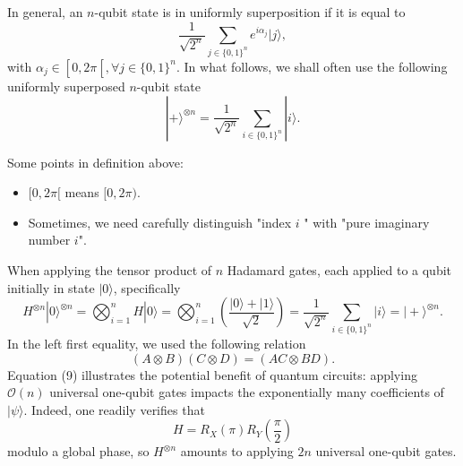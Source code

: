 \begin{definition}
    In general, an $n$-qubit state is in uniformly superposition if it is equal to 
\begin{equation}
    \frac{1}{\sqrt{2^{n}}} \sum_{j \in\{0,1\}^{n}} e^{i \alpha_{j}}|j\rangle,
\end{equation}
with $\alpha_{j} \in\left[0,2 \pi\left[, \forall j \in\{0,1\}^{n}\right.\right.$. %
In what follows, we shall often use the following uniformly superposed $n$-qubit state 
\begin{equation}
    |+\rangle^{\otimes n}=\frac{1}{\sqrt{2^{n}}} \sum_{i \in\{0,1\}^{n}}|i\rangle.
\end{equation}
\end{definition}

\begin{remark} 
Some points in definition above:
    \begin{itemize}
    \item $[0,2 \pi[$ means $[0,2 \pi)$.
    \item Sometimes, we need carefully distinguish "index $i$ " with "pure imaginary number $i$". 
    \end{itemize}
\end{remark}

When applying the tensor product of $n$ Hadamard gates, each applied to a qubit initially in state $|0\rangle$, specifically
\begin{equation}
    H^{\otimes n}|0\rangle^{\otimes n}=\bigotimes_{i=1}^{n} H|0\rangle=\bigotimes_{i=1}^{n}\left(\frac{|0\rangle+|1\rangle}{\sqrt{2}}\right)=\frac{1}{\sqrt{2^{n}}} \sum_{i \in\{0,1\}^{n}}|i\rangle=|+\rangle^{\otimes n}. \tag{9}
\end{equation}
In the left first equality, we used the following relation
\begin{equation}
    (A \otimes B)(C \otimes D)=(A C \otimes B D).
\end{equation}
Equation (9) illustrates the potential benefit of quantum circuits: applying $\mathcal{O}(n)$ universal one-qubit gates impacts the exponentially many coefficients of $|\psi\rangle$. Indeed, one readily verifies that 
\begin{equation}
    H=R_{X}(\pi) R_{Y}\left(\frac{\pi}{2}\right)
\end{equation}
modulo a global phase, so $H^{\otimes n}$ amounts to applying $2 n$ universal one-qubit gates.

